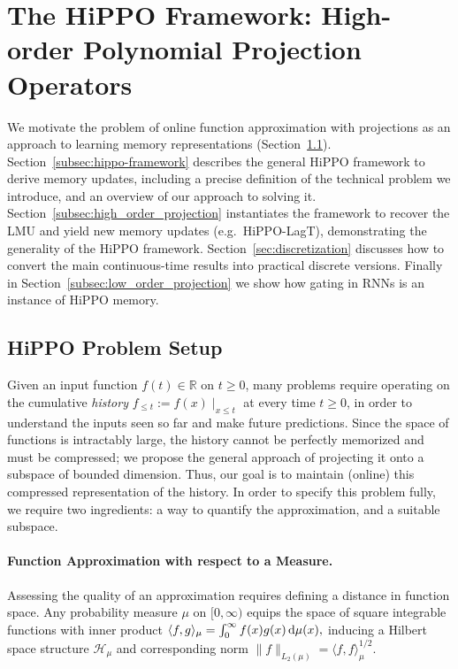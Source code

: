 
\section{The HiPPO Framework: High-order Polynomial Projection Operators}
\label{sec:framework}

We motivate the problem of online function approximation with projections
as an approach to learning memory representations
(Section~\ref{subsec:hippo-setup}).
Section~\ref{subsec:hippo-framework} describes the general
HiPPO framework to derive memory updates, including a precise definition of the technical problem 
we introduce, and an overview of our approach to solving it.
Section~\ref{subsec:high_order_projection} instantiates the framework to recover
the LMU and yield new memory updates (e.g.\ HiPPO-LagT), demonstrating the generality
of the HiPPO framework.
Section~\ref{sec:discretization} discusses how to convert the main continuous-time results into practical discrete versions.
Finally in Section~\ref{subsec:low_order_projection} we show how gating
in RNNs is an instance of HiPPO memory.


\subsection{HiPPO Problem Setup}
\label{subsec:hippo-setup}





Given an input function $f(t) \in \mathbb{R}$ on $t \ge 0$, many problems require operating on the cumulative \emph{history} $f_{\le t} := f(x) \mid_{x \le t}$ at every time $t \ge 0$,
in order to understand the inputs seen so far and make future predictions.
Since the space of functions is intractably large, the history cannot be perfectly memorized and must be compressed; we propose the general approach of projecting it onto a subspace of bounded dimension.
Thus, our goal is to maintain (online) this compressed representation of the history.
In order to specify this problem fully, we require two ingredients: a way to quantify the approximation, and a suitable subspace.


\paragraph{Function Approximation with respect to a Measure.}
Assessing the quality of an approximation requires defining a distance in function space.
Any probability measure $\mu$ on $[0, \infty)$ equips the space of square integrable functions with inner product
$
  \langle f, g \rangle_\mu = \int_0^\infty f(x) g(x) \mathop{}\!\mathrm{d} \mu(x),
$
inducing a Hilbert space structure $\mathcal{H}_\mu$ and corresponding norm $\| f \|_{L_2(\mu)} = \langle f, f \rangle_\mu^{1/2}$.


